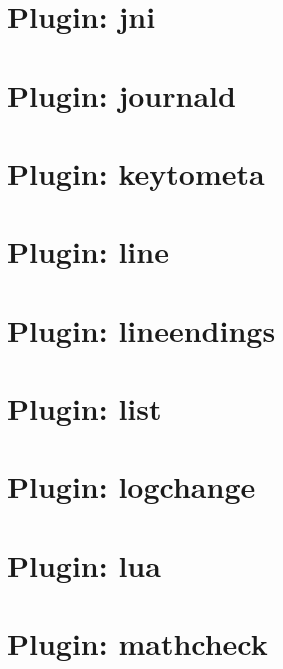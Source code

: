 \documentclass[twoside]{book}
\newcommand{\+}{\discretionary{\mbox{\scriptsize$\hookleftarrow$}}{}{}}
\begin{document}
\chapter{Plugin\+: jni}
\label{md_src_plugins_jni_README}

\chapter{Plugin\+: journald}
\label{md_src_plugins_journald_README}

\chapter{Plugin\+: keytometa}
\label{md_src_plugins_keytometa_README}

\chapter{Plugin\+: line}
\label{md_src_plugins_line_README}

\chapter{Plugin\+: lineendings}
\label{md_src_plugins_lineendings_README}

\chapter{Plugin\+: list}
\label{md_src_plugins_list_README}

\chapter{Plugin\+: logchange}
\label{md_src_plugins_logchange_README}

\chapter{Plugin\+: lua}
\label{md_src_plugins_lua_README}

\chapter{Plugin\+: mathcheck}
\label{md_src_plugins_mathcheck_README}

\end{document}
